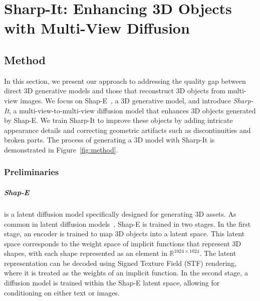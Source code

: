 \chapter{Sharp-It: Enhancing 3D Objects with Multi-View Diffusion}
\label{chap:firstchap}


\section{Method}


In this section, we present our approach to addressing the quality gap between direct 3D generative models and those that reconstruct 3D objects from multi-view images.
We focus on Shap-E~\cite{jun2023shape}, a 3D generative model, and introduce \emph{Sharp-It}, a multi-view-to-multi-view diffusion model that enhances 3D objects generated by Shap-E. We train Sharp-It to improve these objects by adding intricate appearance details and correcting geometric artifacts such as discontinuities and broken parts.
The process of generating a 3D model with Sharp-It is demonstrated in Figure~\ref{fig:method}.

\subsection{Preliminaries}%
\paragraph{Shap-E} is a latent diffusion model specifically designed for generating 3D assets. As common in latent diffusion models~\cite{rombach2022highresolutionimagesynthesislatent}, Shap-E is trained in two stages. In the first stage, an encoder is trained to map 3D objects into a latent space. This latent space corresponds to the weight space of implicit functions that represent 3D shapes, with each shape represented as an element in $\mathbb{R}^{1024\times1024}$. The latent representation can be decoded using Signed Texture Field (STF) rendering, where it is treated as the weights of an implicit function.
In the second stage, a diffusion model is trained within the Shap-E latent space, allowing for conditioning on either text or images.

